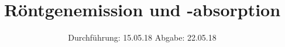 

\subject{V602}
\title{Röntgenemission und -absorption}
\date{
  Durchführung: 15.05.18
  \hspace{3em}
  Abgabe: 22.05.18
}



\maketitle
\thispagestyle{empty}
\tableofcontents
\newpage








\newpage
\printbibliography


